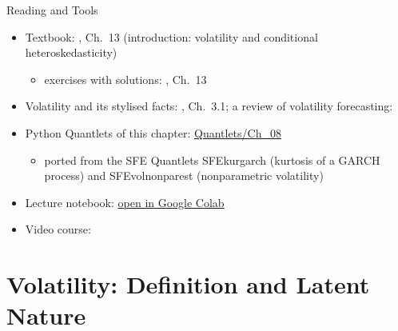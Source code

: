 \begin{frame}{Reading and Tools}
\itemsize{\small}
\begin{itemize}
    \item Textbook: , Ch.~13 (introduction: volatility and conditional heteroskedasticity)
    \begin{itemize}
        \item exercises with solutions: , Ch.~13
    \end{itemize}
    \item Volatility and its stylised facts: , Ch.~3.1; a review of volatility forecasting: 
    \item Python Quantlets of this chapter: \href{https://github.com/danpele/SFM/tree/main/Quantlets/Ch_08}{Quantlets/Ch\_08}
    \begin{itemize}
        \item ported from the SFE Quantlets SFEkurgarch (kurtosis of a GARCH process) and SFEvolnonparest (nonparametric volatility)
    \end{itemize}
    \item Lecture notebook: \href{\colaburl{notebooks/EN/chapter8_lecture_notebook.ipynb}}{open in Google Colab}
    \item Video course: 
\end{itemize}
\end{frame}


\section{Volatility: Definition and Latent Nature}

